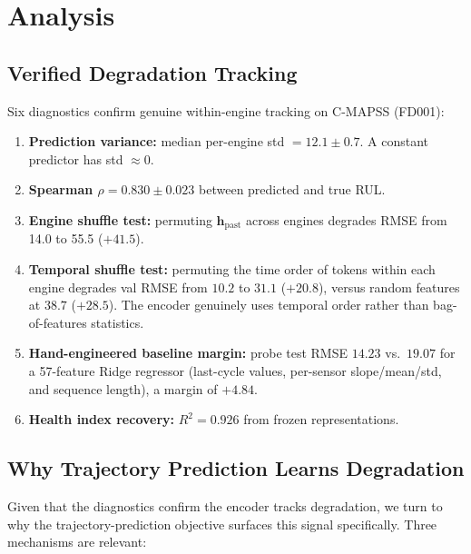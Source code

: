 \documentclass{article}
\newcommand{\h}{\mathbf{h}}
\begin{document}
\section{Analysis}
\label{sec:analysis}

\subsection{Verified Degradation Tracking}
\label{sec:verification}

Six diagnostics confirm genuine within-engine tracking on C-MAPSS (FD001):
\begin{enumerate}[nosep]
  \item \textbf{Prediction variance:} median per-engine std $= 12.1 \pm 0.7$. A constant predictor has std $\approx 0$.
  \item \textbf{Spearman $\rho = 0.830 \pm 0.023$} between predicted and true RUL.
  \item \textbf{Engine shuffle test:} permuting $\h_\text{past}$ across engines degrades RMSE from 14.0 to 55.5 ($+41.5$).
  \item \textbf{Temporal shuffle test:} permuting the time order of tokens within each engine degrades val RMSE from $10.2$ to $31.1$ ($+20.8$), versus random features at $38.7$ ($+28.5$). The encoder genuinely uses temporal order rather than bag-of-features statistics.
  \item \textbf{Hand-engineered baseline margin:} probe test RMSE $14.23$ vs.\ $19.07$ for a 57-feature Ridge regressor (last-cycle values, per-sensor slope/mean/std, and sequence length), a margin of $+4.84$.
  \item \textbf{Health index recovery:} $R^2 = 0.926$ from frozen representations.
\end{enumerate}

\subsection{Why Trajectory Prediction Learns Degradation}
\label{sec:theory}

Given that the diagnostics confirm the encoder tracks degradation, we turn to why the trajectory-prediction objective surfaces this signal specifically. Three mechanisms are relevant:
\end{document}
